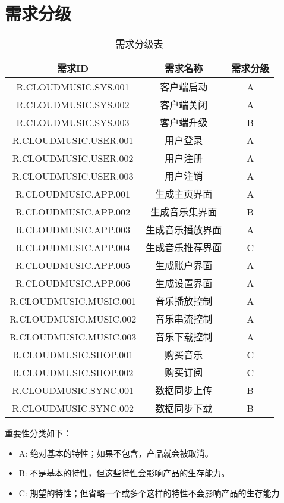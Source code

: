 \chapter{需求分级}
\begin{table}[htbp]
\centering
\caption{需求分级表} \label{tab:classification}
\begin{tabular}{|c|c|c|}
    \hline
    需求ID & 需求名称 & 需求分级 \\
    \hline
    R.CLOUDMUSIC.SYS.001 & 客户端启动 & A \\
    \hline
    R.CLOUDMUSIC.SYS.002 & 客户端关闭 & A \\
    \hline
    R.CLOUDMUSIC.SYS.003 & 客户端升级 & B \\
    \hline
    R.CLOUDMUSIC.USER.001 & 用户登录 & A \\
    \hline
    R.CLOUDMUSIC.USER.002 & 用户注册 & A \\
    \hline
    R.CLOUDMUSIC.USER.003 & 用户注销 & A \\
    \hline
    R.CLOUDMUSIC.APP.001 & 生成主页界面 & A \\
    \hline
    R.CLOUDMUSIC.APP.002 & 生成音乐集界面 & B \\
    \hline
    R.CLOUDMUSIC.APP.003 & 生成音乐播放界面 & A \\
    \hline
    R.CLOUDMUSIC.APP.004 & 生成音乐推荐界面 & C \\
    \hline
    R.CLOUDMUSIC.APP.005 & 生成账户界面 & A \\
    \hline
    R.CLOUDMUSIC.APP.006 & 生成设置界面 & A \\
    \hline
    R.CLOUDMUSIC.MUSIC.001 & 音乐播放控制 & A \\
    \hline
    R.CLOUDMUSIC.MUSIC.002 & 音乐串流控制 & A \\
    \hline
    R.CLOUDMUSIC.MUSIC.003 & 音乐下载控制 & A \\
    \hline
    R.CLOUDMUSIC.SHOP.001 & 购买音乐 & C \\
    \hline
    R.CLOUDMUSIC.SHOP.002 & 购买订阅 & C \\
    \hline
    R.CLOUDMUSIC.SYNC.001 & 数据同步上传 & B \\
    \hline
    R.CLOUDMUSIC.SYNC.002 & 数据同步下载 & B \\
    \hline
\end{tabular}
\end{table}

重要性分类如下：
\begin{itemize}
\item A: 绝对基本的特性；如果不包含，产品就会被取消。
\item B: 不是基本的特性，但这些特性会影响产品的生存能力。
\item C: 期望的特性；但省略一个或多个这样的特性不会影响产品的生存能力
\end{itemize}
